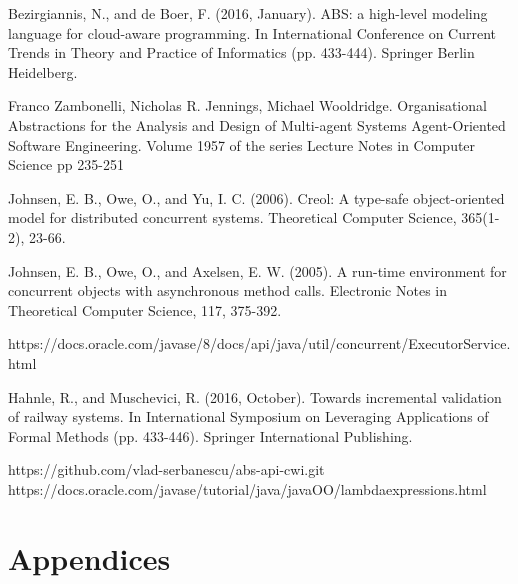 \documentclass[runningheads,a4paper]{llncs}
\begin{document}
\begin{thebibliography}{4}
		 Bezirgiannis, N., and de Boer, F. (2016, January). ABS: a high-level modeling language for cloud-aware programming. In International Conference on Current Trends in Theory and Practice of Informatics (pp. 433-444). Springer Berlin Heidelberg.
		
		Franco Zambonelli, Nicholas R. Jennings, Michael Wooldridge. 
		Organisational Abstractions for the Analysis and Design of Multi-agent Systems
		Agent-Oriented Software Engineering. Volume 1957 of the series Lecture Notes in Computer Science pp 235-251
		
		 Johnsen, E. B., Owe, O., and Yu, I. C. (2006). Creol: A type-safe object-oriented model for distributed concurrent systems. Theoretical Computer Science, 365(1-2), 23-66.
		
		 Johnsen, E. B., Owe, O., and Axelsen, E. W. (2005). A run-time environment for concurrent objects with asynchronous method calls. Electronic Notes in Theoretical Computer Science, 117, 375-392.
		
		 https://docs.oracle.com/javase/8/docs/api/java/util/concurrent/ExecutorService.html
		
		Hahnle, R., and Muschevici, R. (2016, October). Towards incremental validation of railway systems. In International Symposium on Leveraging Applications of Formal Methods (pp. 433-446). Springer International Publishing.
		
		https://github.com/vlad-serbanescu/abs-api-cwi.git
		 https://docs.oracle.com/javase/tutorial/java/javaOO/lambdaexpressions.html
	\end{thebibliography}
	
\appendix
\section{Appendices} 
\end{document}
